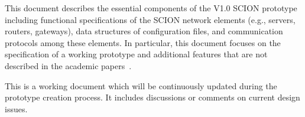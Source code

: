 \abstract

This document describes the essential components of the V1.0 SCION
prototype including functional specifications of the SCION network
elements (e.g., servers, routers, gateways), data structures of
configuration files, and communication protocols among these
elements. In particular, this document focuses on the specification
of a working prototype and additional features that are not described
in the academic papers~\cite{ZHHCPA2011}.

This is a working document which will be continuously updated during
the prototype creation process. It includes discussions or comments
on current design issues.


